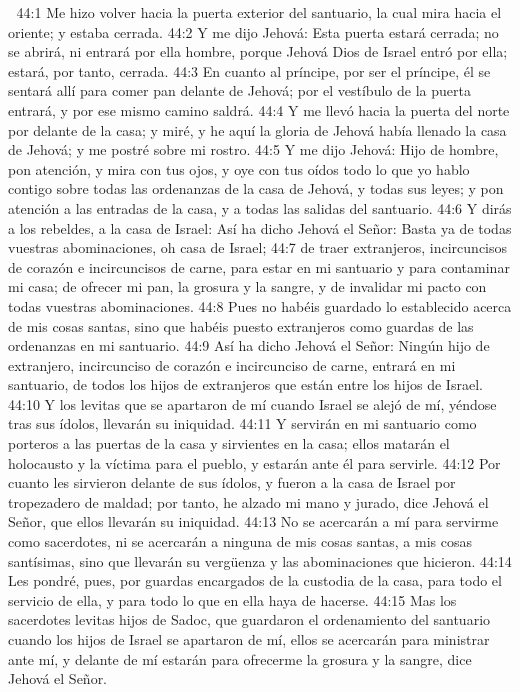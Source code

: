 
44:1 Me hizo volver hacia la puerta exterior del santuario, la cual mira hacia el oriente; y estaba cerrada.  
44:2 Y me dijo Jehová: Esta puerta estará cerrada; no se abrirá, ni entrará por ella hombre, porque Jehová Dios de Israel entró por ella; estará, por tanto, cerrada.  
44:3 En cuanto al príncipe, por ser el príncipe, él se sentará allí para comer pan delante de Jehová; por el vestíbulo de la puerta entrará, y por ese mismo camino saldrá.  
44:4 Y me llevó hacia la puerta del norte por delante de la casa; y miré, y he aquí la gloria de Jehová había llenado la casa de Jehová; y me postré sobre mi rostro.  
44:5 Y me dijo Jehová: Hijo de hombre, pon atención, y mira con tus ojos, y oye con tus oídos todo lo que yo hablo contigo sobre todas las ordenanzas de la casa de Jehová, y todas sus leyes; y pon atención a las entradas de la casa, y a todas las salidas del santuario.  
44:6 Y dirás a los rebeldes, a la casa de Israel: Así ha dicho Jehová el Señor: Basta ya de todas vuestras abominaciones, oh casa de Israel;  
44:7 de traer extranjeros, incircuncisos de corazón e incircuncisos de carne, para estar en mi santuario y para contaminar mi casa; de ofrecer mi pan, la grosura y la sangre, y de invalidar mi pacto con todas vuestras abominaciones.  
44:8 Pues no habéis guardado lo establecido acerca de mis cosas santas, sino que habéis puesto extranjeros como guardas de las ordenanzas en mi santuario.  
44:9 Así ha dicho Jehová el Señor: Ningún hijo de extranjero, incircunciso de corazón e incircunciso de carne, entrará en mi santuario, de todos los hijos de extranjeros que están entre los hijos de Israel.  
44:10 Y los levitas que se apartaron de mí cuando Israel se alejó de mí, yéndose tras sus ídolos, llevarán su iniquidad.  
44:11 Y servirán en mi santuario como porteros a las puertas de la casa y sirvientes en la casa; ellos matarán el holocausto y la víctima para el pueblo, y estarán ante él para servirle.  
44:12 Por cuanto les sirvieron delante de sus ídolos, y fueron a la casa de Israel por tropezadero de maldad; por tanto, he alzado mi mano y jurado, dice Jehová el Señor, que ellos llevarán su iniquidad.  
44:13 No se acercarán a mí para servirme como sacerdotes, ni se acercarán a ninguna de mis cosas santas, a mis cosas santísimas, sino que llevarán su vergüenza y las abominaciones que hicieron.  
44:14 Les pondré, pues, por guardas encargados de la custodia de la casa, para todo el servicio de ella, y para todo lo que en ella haya de hacerse.  
44:15 Mas los sacerdotes levitas hijos de Sadoc, que guardaron el ordenamiento del santuario cuando los hijos de Israel se apartaron de mí, ellos se acercarán para ministrar ante mí, y delante de mí estarán para ofrecerme la grosura y la sangre, dice Jehová el Señor.  
